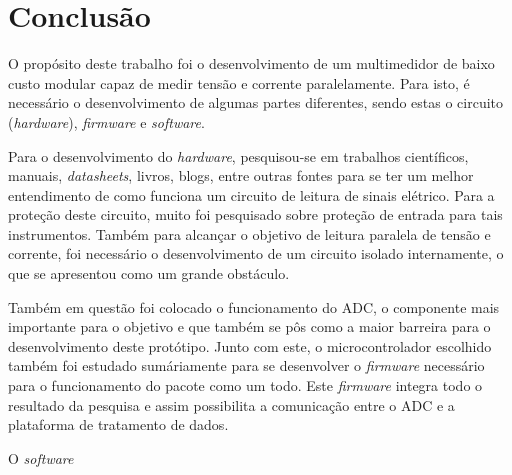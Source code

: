 \chapter{Conclusão}\label{cap:conclusoeseperspectivas}

O propósito deste trabalho foi o desenvolvimento de um multimedidor de baixo custo modular capaz de medir tensão e corrente paralelamente. Para isto, é necessário o desenvolvimento de algumas partes diferentes, sendo estas o circuito (\textit{hardware}), \textit{firmware} e \textit{software}.

Para o desenvolvimento do \textit{hardware}, pesquisou-se em trabalhos científicos, manuais, \textit{datasheets}, livros, blogs, entre outras fontes para se ter um melhor entendimento de como funciona um circuito de leitura de sinais elétrico. Para a proteção deste circuito, muito foi pesquisado sobre proteção de entrada para tais instrumentos. Também para alcançar o objetivo de leitura paralela de tensão e corrente, foi necessário o desenvolvimento de um circuito isolado internamente, o que se apresentou como um grande obstáculo.

Também em questão foi colocado o funcionamento do ADC, o componente mais importante para o objetivo e que também se pôs como a maior barreira para o desenvolvimento deste protótipo. Junto com este, o microcontrolador escolhido também foi estudado sumáriamente para se desenvolver o \textit{firmware} necessário para o funcionamento do pacote como um todo. Este \textit{firmware} integra todo o resultado da pesquisa e assim possibilita a comunicação entre o ADC e a plataforma de tratamento de dados.

O \textit{software}